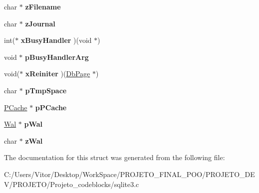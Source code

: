 \begin{DoxyCompactItemize}
\item 
\hypertarget{struct_pager_a2a55a044468f8658b7993e57087a5561}{char $\ast$ {\bfseries z\-Filename}}\label{struct_pager_a2a55a044468f8658b7993e57087a5561}

\item 
\hypertarget{struct_pager_ab36ce1f606c407ad3fc56a3651f5a319}{char $\ast$ {\bfseries z\-Journal}}\label{struct_pager_ab36ce1f606c407ad3fc56a3651f5a319}

\item 
\hypertarget{struct_pager_ac8477f7cc39fefd81b4089994e13d215}{int($\ast$ {\bfseries x\-Busy\-Handler} )(void $\ast$)}\label{struct_pager_ac8477f7cc39fefd81b4089994e13d215}

\item 
\hypertarget{struct_pager_a7a685e7a8dcbcd725c5a982fd8deb91b}{void $\ast$ {\bfseries p\-Busy\-Handler\-Arg}}\label{struct_pager_a7a685e7a8dcbcd725c5a982fd8deb91b}

\item 
\hypertarget{struct_pager_a632d3c81743a7f9104337ae3d45af04c}{void($\ast$ {\bfseries x\-Reiniter} )(\hyperlink{struct_pg_hdr}{Db\-Page} $\ast$)}\label{struct_pager_a632d3c81743a7f9104337ae3d45af04c}

\item 
\hypertarget{struct_pager_a64934188c72599e0be9ae54d3fc1cc92}{char $\ast$ {\bfseries p\-Tmp\-Space}}\label{struct_pager_a64934188c72599e0be9ae54d3fc1cc92}

\item 
\hypertarget{struct_pager_ae2495e45e354e92a858144386f91cab3}{\hyperlink{struct_p_cache}{P\-Cache} $\ast$ {\bfseries p\-P\-Cache}}\label{struct_pager_ae2495e45e354e92a858144386f91cab3}

\item 
\hypertarget{struct_pager_a2c759424108248d8b08e6f400fab14dd}{\hyperlink{struct_wal}{Wal} $\ast$ {\bfseries p\-Wal}}\label{struct_pager_a2c759424108248d8b08e6f400fab14dd}

\item 
\hypertarget{struct_pager_ac63ab281e48f9ac8521b85c1a90475b3}{char $\ast$ {\bfseries z\-Wal}}\label{struct_pager_ac63ab281e48f9ac8521b85c1a90475b3}

\end{DoxyCompactItemize}


The documentation for this struct was generated from the following file\-:\begin{DoxyCompactItemize}
\item 
C\-:/\-Users/\-Vitor/\-Desktop/\-Work\-Space/\-P\-R\-O\-J\-E\-T\-O\-\_\-\-F\-I\-N\-A\-L\-\_\-\-P\-O\-O/\-P\-R\-O\-J\-E\-T\-O\-\_\-\-D\-E\-V/\-P\-R\-O\-J\-E\-T\-O/\-Projeto\-\_\-codeblocks/sqlite3.\-c\end{DoxyCompactItemize}
